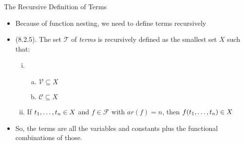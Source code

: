\begin{frame}{The Recursive Definition of Terms}

	\begin{itemize}
	
		\item Because of function nesting, we need to define terms recursively
	
		\item (8.2.5). The set $\mathcal{T}$ of \emph{terms} is recursively defined as the smallest set $X$ such that:
		\begin{enumerate}[(i)]
		
			\item \begin{enumerate}[(a)]
			\item $\mathcal{V}\subseteq X$
			\item $\mathcal{C}\subseteq X$
			\end{enumerate}
			\item If $t_1, \mathellipsis, t_n\in X$ and $f\in\mathcal{F}$ with $ar(f)=n$, then $f(t_1, \mathellipsis, t_n)\in X$
	
	\end{enumerate}
	
		\item So, the terms are all the variables and constants plus the functional combinations of those.
		
	\end{itemize}

\end{frame}

